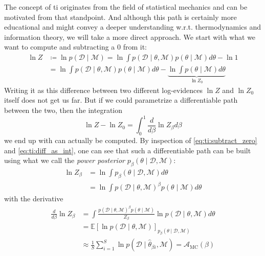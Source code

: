 \documentclass[\relativeRoot/main.tex]{subfiles}
\begin{document}
The concept of \gls{ti} originates from the field of statistical mechanics and can be motivated from that standpoint. And although this path is certainly more educational and might convey a deeper understanding w.r.t. thermodynamics and information theory, we will take a more direct approach. We start with what we want to compute and subtracting a 0 from it:
%
\begin{equation} \label{eq:ti:subtract_zero}
    \begin{aligned}
        \ln{Z} &\coloneqq \ln{p(\boldsymbol{\mathcal{D}} \mid \mathcal{M})} = \ln{\int{ p\left( \boldsymbol{\mathcal{D}} \mid \theta, \mathcal{M} \right) p(\theta \mid \mathcal{M}) d\theta}} - \ln{1} \\
        &= \ln{\int{ p\left( \boldsymbol{\mathcal{D}} \mid \theta, \mathcal{M} \right) p(\theta \mid \mathcal{M}) d\theta}} - \underbrace{ \ln{ \int{ p(\theta \mid \mathcal{M}) d\theta} } }_{\ln{Z_0}}
    \end{aligned}
\end{equation}
%
Writing it as this difference between two different log-evidences $\ln{Z}$ and $\ln{Z_0}$ itself does not get us far. But if we could parametrize a differentiable path between the two, then the integration
%
\begin{equation} \label{eq:ti:diff_as_int}
    \ln{Z} - \ln{Z_0} = \int_0^1{ \frac{d}{d\beta} \ln{Z_\beta} d\beta}
\end{equation}
%
we end up with can actually be computed. By inspection of \cref{eq:ti:subtract_zero} and \cref{eq:ti:diff_as_int}, one can see that such a differentiable path can be built using what we call the \emph{power posterior} $p_\beta (\theta \mid \boldsymbol{\mathcal{D}}, \mathcal{M})$:
%
\begin{equation} \label{eq:ti:power_post}
    \begin{aligned}
        \ln{Z_\beta} &= \ln{ \int{ p_\beta (\theta \mid \boldsymbol{\mathcal{D}}, \mathcal{M}) d\theta} } \\
        &= \ln{\int{ p\left( \boldsymbol{\mathcal{D}} \mid \theta, \mathcal{M} \right)^\beta p(\theta \mid \mathcal{M}) d\theta}}
    \end{aligned}
\end{equation}
%
with the derivative
%
\begin{equation} \label{eq:ti:accuracy}
    \begin{aligned}
        \frac{d}{d\beta} \ln{Z_\beta} &= \int{ \frac{p\left( \boldsymbol{\mathcal{D}} \mid \theta, \mathcal{M} \right)^\beta p(\theta \mid \mathcal{M})}{Z_\beta} \ln{p(\boldsymbol{\mathcal{D}} \mid \theta, \mathcal{M} )} d\theta} \\
        &= \mathbb{E}\left[ \ln{ p(\boldsymbol{\mathcal{D}} \mid \theta, \mathcal{M}) } \right]_{p_\beta (\theta \mid \boldsymbol{\mathcal{D}}, \mathcal{M})} \\
        &\approx \frac{1}{S} \sum_{i=1}^S{ \ln{ p(\boldsymbol{\mathcal{D}} \mid \hat{\theta}_{\beta i}, \mathcal{M}) } } = \mathcal{A}_\text{MC}(\beta)
    \end{aligned}
\end{equation}
\end{document}
